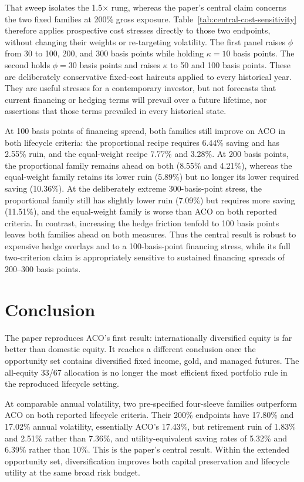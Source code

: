 \documentclass[11pt]{article}
\begin{document}
That sweep isolates the 1.5$\times$ rung, whereas the paper's central claim
concerns the two fixed families at 200\% gross exposure. Table~\ref{tab:central-cost-sensitivity}
therefore applies prospective cost stresses directly to those two endpoints,
without changing their weights or re-targeting volatility. The first panel
raises $\phi$ from 30 to 100, 200, and 300 basis points while holding
$\kappa=10$ basis points. The second holds $\phi=30$ basis points and raises
$\kappa$ to 50 and 100 basis points. These are deliberately conservative
fixed-cost haircuts applied to every historical year. They are useful stresses
for a contemporary investor, but not forecasts that current financing or
hedging terms will prevail over a future lifetime, nor assertions that those
terms prevailed in every historical state.



At 100 basis points of financing spread, both families still improve on ACO in
both lifecycle criteria: the proportional recipe requires 6.44\% saving and
has 2.55\% ruin, and the equal-weight recipe 7.77\% and 3.28\%. At 200 basis
points, the proportional family remains ahead on both (8.55\% and 4.21\%),
whereas the equal-weight family retains its lower ruin (5.89\%) but no longer
its lower required saving (10.36\%). At the deliberately extreme \mbox{300-basis-point}
stress, the proportional family still has slightly lower ruin (7.09\%)
but requires more saving (11.51\%), and the equal-weight family is worse than
ACO on both reported criteria. In contrast, increasing the hedge friction tenfold
to 100 basis points leaves both families ahead on both measures. Thus the
central result is robust to expensive hedge overlays and to a 100-basis-point
financing stress, while its full two-criterion claim is appropriately sensitive
to sustained financing spreads of 200--300 basis points.

\section{Conclusion}

The paper reproduces ACO's first result: internationally diversified equity is
far better than domestic equity. It reaches a different conclusion once the
opportunity set contains diversified fixed income, gold, and managed futures.
The all-equity 33/67 allocation is no longer the most efficient fixed portfolio
rule in the reproduced lifecycle setting.

At comparable annual volatility, two pre-specified four-sleeve families
outperform ACO on both reported lifecycle criteria. Their 200\% endpoints have
17.80\% and 17.02\% annual volatility, essentially ACO's 17.43\%, but
retirement ruin of 1.83\% and 2.51\% rather than 7.36\%, and
utility-equivalent saving rates of 5.32\% and 6.39\% rather than 10\%. This is
the paper's central result. Within the extended opportunity set,
diversification improves both capital preservation and lifecycle utility at the
same broad risk budget.
\end{document}
